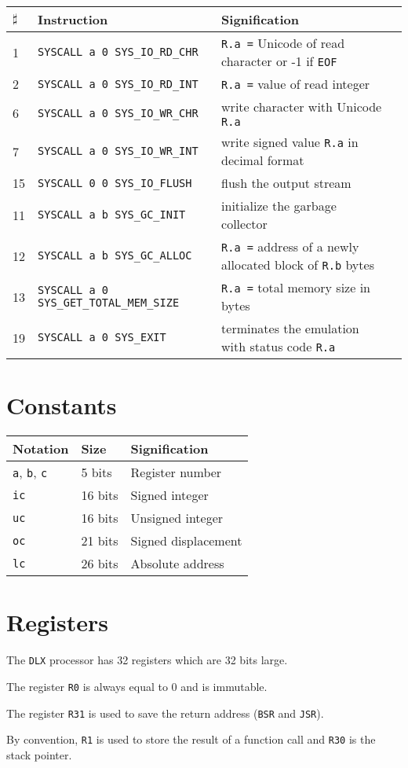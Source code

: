 \documentclass[10pt,a4paper]{article}
\begin{document}
\begin{tabular}{|l|l|l|l|}
\hline
$\sharp$ & \bf Instruction & \bf Signification \\ \hline \hline

1 & \verb#SYSCALL a 0 SYS_IO_RD_CHR# & \verb#R.a =# Unicode of read character or -1 if \verb#EOF# \\ \hline
2 & \verb#SYSCALL a 0 SYS_IO_RD_INT# & \verb#R.a =# value of read integer \\ \hline \hline

6 & \verb#SYSCALL a 0 SYS_IO_WR_CHR# & write character with Unicode \verb#R.a# \\ \hline
7 & \verb#SYSCALL a 0 SYS_IO_WR_INT# & write signed value \verb#R.a# in decimal format \\ \hline \hline

15 & \verb#SYSCALL 0 0 SYS_IO_FLUSH# & flush the output stream \\ \hline \hline

11 & \verb#SYSCALL a b SYS_GC_INIT# & initialize the garbage collector \\ \hline
12 & \verb#SYSCALL a b SYS_GC_ALLOC# & \verb#R.a =# address of a newly allocated block of \verb#R.b# bytes \\ \hline \hline

13 & \verb#SYSCALL a 0 SYS_GET_TOTAL_MEM_SIZE# & \verb#R.a =# total memory size in bytes \\ \hline \hline

19 & \verb#SYSCALL a 0 SYS_EXIT# & terminates the emulation with status code \verb#R.a# \\ \hline 
\end{tabular}

\section{Constants}

\begin{tabular}{|l|l|l|}
\hline
\bf Notation & \bf Size & \bf Signification \\ \hline \hline
\verb/a/, \verb/b/, \verb/c/ & 5 bits & Register number \\
\verb/ic/ & 16 bits & Signed integer \\
\verb/uc/ & 16 bits & Unsigned integer \\
\verb/oc/ & 21 bits & Signed displacement \\
\verb/lc/ & 26 bits & Absolute address \\
\hline
\end{tabular}

\section{Registers}
\noindent 
The \verb/DLX/ processor has 32 registers which are 32 bits large.

\noindent
The register \verb/R0/ is always equal to $0$ and is immutable.

\noindent
The register \verb/R31/ is used to save the return address (\verb/BSR/ and \verb/JSR/).

\noindent
By convention, \verb/R1/ is used to store the result of a function
call and \verb/R30/ is the stack pointer.
\end{document}
